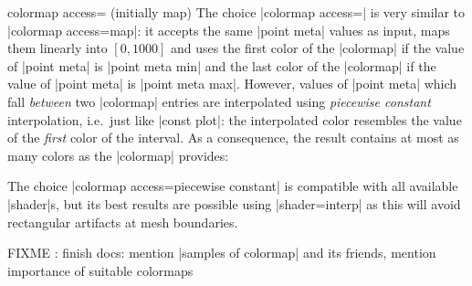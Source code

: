 \begin{pgfplotskey}{colormap access= (initially map)}
	The choice |colormap access=| is very similar to |colormap access=map|: it accepts the same |point meta| values as input, maps them linearly into $[0,1000]$ and uses the first color of the |colormap| if the value of |point meta| is |point meta min| and the last color of the |colormap| if the value of |point meta| is |point meta max|. However, values of |point meta| which fall \emph{between} two |colormap| entries are interpolated using \emph{piecewise constant} interpolation, i.e.\ just like |const plot|: the interpolated color resembles the value of the \emph{first} color of the interval. As a consequence, the result contains at most  as many colors as the |colormap| provides:
\begin{codeexample}[]
\end{codeexample}
	The choice |colormap access=piecewise constant| is compatible with all available |shader|s, but its best results are possible using |shader=interp| as this will avoid rectangular artifacts at mesh boundaries.
\begin{codeexample}[]
\end{codeexample}

	FIXME : finish docs: mention |samples of colormap| and its friends, mention importance of suitable colormaps
\end{pgfplotskey}


